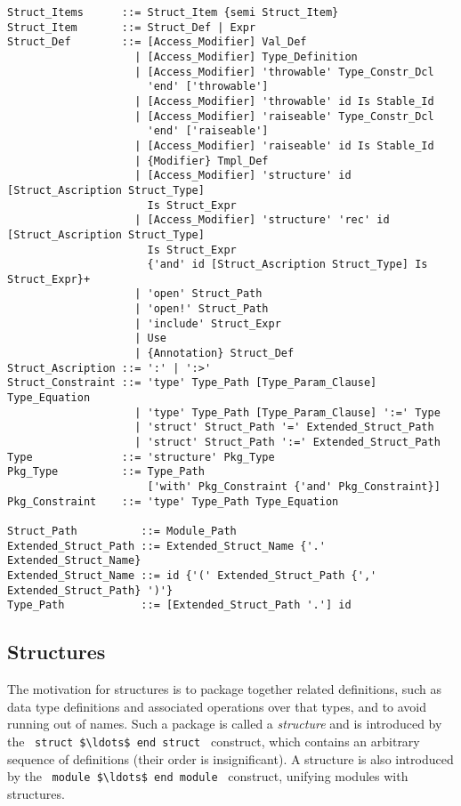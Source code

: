 \begin{lstlisting}
Struct_Items      ::= Struct_Item {semi Struct_Item} 
Struct_Item       ::= Struct_Def | Expr
Struct_Def        ::= [Access_Modifier] Val_Def
                    | [Access_Modifier] Type_Definition
                    | [Access_Modifier] 'throwable' Type_Constr_Dcl 
                      'end' ['throwable']
                    | [Access_Modifier] 'throwable' id Is Stable_Id
                    | [Access_Modifier] 'raiseable' Type_Constr_Dcl 
                      'end' ['raiseable']
                    | [Access_Modifier] 'raiseable' id Is Stable_Id
                    | {Modifier} Tmpl_Def
                    | [Access_Modifier] 'structure' id [Struct_Ascription Struct_Type] 
                      Is Struct_Expr
                    | [Access_Modifier] 'structure' 'rec' id [Struct_Ascription Struct_Type] 
                      Is Struct_Expr
                      {'and' id [Struct_Ascription Struct_Type] Is Struct_Expr}+
                    | 'open' Struct_Path
                    | 'open!' Struct_Path
                    | 'include' Struct_Expr
                    | Use
                    | {Annotation} Struct_Def
Struct_Ascription ::= ':' | ':>'
Struct_Constraint ::= 'type' Type_Path [Type_Param_Clause] Type_Equation
                    | 'type' Type_Path [Type_Param_Clause] ':=' Type
                    | 'struct' Struct_Path '=' Extended_Struct_Path
                    | 'struct' Struct_Path ':=' Extended_Struct_Path
Type              ::= 'structure' Pkg_Type
Pkg_Type          ::= Type_Path 
                      ['with' Pkg_Constraint {'and' Pkg_Constraint}]
Pkg_Constraint    ::= 'type' Type_Path Type_Equation 

Struct_Path          ::= Module_Path
Extended_Struct_Path ::= Extended_Struct_Name {'.' Extended_Struct_Name}
Extended_Struct_Name ::= id {'(' Extended_Struct_Path {',' Extended_Struct_Path} ')'}
Type_Path            ::= [Extended_Struct_Path '.'] id
\end{lstlisting}






\subsection{Structures}

The motivation for structures is to package together related definitions, such as data type definitions and associated operations over that types, and to avoid running out of names. Such a package is called a {\em structure} and is introduced by the ~\lstinline!struct $\ldots$ end struct!~ construct, which contains an arbitrary sequence of definitions (their order is insignificant). A structure is also introduced by the ~\lstinline!module $\ldots$ end module!~ construct, unifying modules with structures. 


